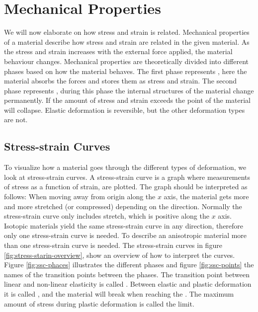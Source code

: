 \section{Mechanical Properties}
\label{mechanical-properties}
We will now elaborate on how stress and strain is related. Mechanical
properties of a material describe how stress and 
strain are related in the given material.
%
As the stress and strain increases with the external force applied,
the material behaviour changes.
Mechanical properties are theoretically divided into different
phases based on how the material behaves. The first phase represents  
, here the material absorbs the forces and
stores them as stress and strain. The second phase represents
, during this phase the internal structures
of the material change permanently. If the amount of stress and
strain exceeds the point of  the material will collapse.
Elastic deformation is reversible, but the other deformation types are not.



\subsection{Stress-strain Curves}
\label{sec:sscs}
To visualize how a material goes through the different
types of deformation, we look at stress-strain curves. A stress-strain
curve is a graph where measurements of stress as a function of
strain, are plotted. The graph should be interpreted as follows: When
moving away from origin along the $x$ axis, the material gets more and
more stretched (or compressed) depending on the direction. Normally
the stress-strain curve only includes stretch, which is positive along
the $x$ axis.
%
Isotopic materials yield the same stress-strain curve in
any direction, therefore only one stress-strain curve is needed. To
describe an anisotropic material more than one stress-strain curve is
needed.
%
The stress-strain curves in figure \vref{fig:stress-starin-overview},
show an overview of how to interpret the curves. Figure
\ref{fig:ssc-phaces} illustrates the different phases and figure
\ref{fig:ssc-points} the names of the transition points between the
phases. The transition point between linear and non-linear elasticity
is called . Between elastic and
plastic deformation it is called , and the
material will break when reaching the .
The maximum amount of stress during plastic deformation is called the
 limit.

